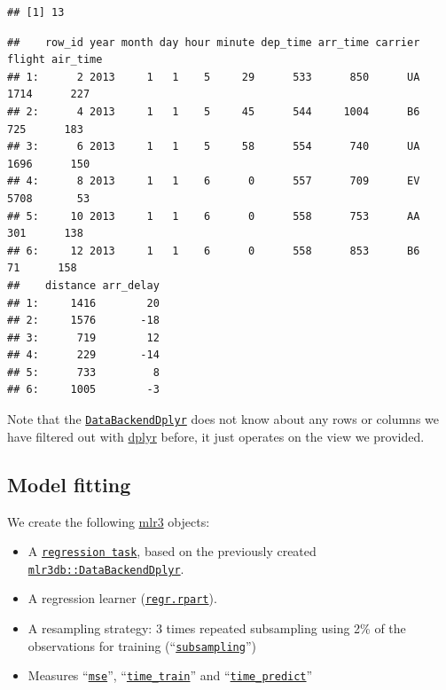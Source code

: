 \documentclass[
]{scrbook}
\newenvironment{Shaded}{\begin{snugshade}}{\end{snugshade}}
\newcommand{\FunctionTok}[1]{\textcolor[rgb]{0.00,0.00,0.00}{#1}}
\newcommand{\NormalTok}[1]{#1}
\newcommand{\SpecialCharTok}[1]{\textcolor[rgb]{0.00,0.00,0.00}{#1}}
\providecommand{\tightlist}{%
  \setlength{\itemsep}{0pt}\setlength{\parskip}{0pt}}
\renewenvironment{Shaded} {\begin{snugshade}\small} {\end{snugshade}}
\begin{document}
\begin{verbatim}
## [1] 13
\end{verbatim}

\begin{Shaded}
\end{Shaded}

\begin{verbatim}
##    row_id year month day hour minute dep_time arr_time carrier flight air_time
## 1:      2 2013     1   1    5     29      533      850      UA   1714      227
## 2:      4 2013     1   1    5     45      544     1004      B6    725      183
## 3:      6 2013     1   1    5     58      554      740      UA   1696      150
## 4:      8 2013     1   1    6      0      557      709      EV   5708       53
## 5:     10 2013     1   1    6      0      558      753      AA    301      138
## 6:     12 2013     1   1    6      0      558      853      B6     71      158
##    distance arr_delay
## 1:     1416        20
## 2:     1576       -18
## 3:      719        12
## 4:      229       -14
## 5:      733         8
## 6:     1005        -3
\end{verbatim}

Note that the \href{https://mlr3db.mlr-org.com/reference/DataBackendDplyr.html}{\texttt{DataBackendDplyr}} does not know about any rows or columns we have filtered out with \href{https://cran.r-project.org/package=dplyr}{dplyr} before, it just operates on the view we provided.

\hypertarget{model-fitting}{%
\subsection{Model fitting}\label{model-fitting}}

We create the following \href{https://mlr3.mlr-org.com}{mlr3} objects:

\begin{itemize}
\tightlist
\item
  A \href{https://mlr3.mlr-org.com/reference/TaskRegr.html}{\texttt{regression\ task}}, based on the previously created \href{https://mlr3db.mlr-org.com/reference/DataBackendDplyr.html}{\texttt{mlr3db::DataBackendDplyr}}.
\item
  A regression learner (\href{https://mlr3.mlr-org.com/reference/mlr_learners_regr.rpart.html}{\texttt{regr.rpart}}).
\item
  A resampling strategy: 3 times repeated subsampling using 2\% of the observations for training (``\href{https://mlr3.mlr-org.com/reference/mlr_resamplings_subsampling.html}{\texttt{subsampling}}'')
\item
  Measures ``\href{https://mlr3.mlr-org.com/reference/mlr_measures_regr.mse.html}{\texttt{mse}}'', ``\href{https://mlr3.mlr-org.com/reference/mlr_measures_elapsed_time.html}{\texttt{time\_train}}'' and ``\href{https://mlr3.mlr-org.com/reference/mlr_measures_elapsed_time.html}{\texttt{time\_predict}}''
\end{itemize}
\end{document}
